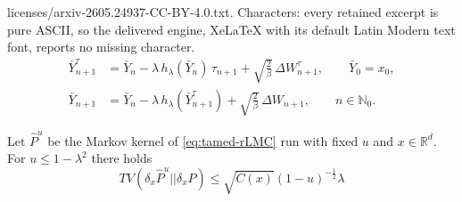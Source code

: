 \documentclass[10pt,a4paper]{amsart}
\begin{document}
licenses/arxiv-2605.24937-CC-BY-4.0.txt. Characters: every retained excerpt is pure ASCII, so the delivered engine, XeLaTeX with its default Latin Modern text font, reports no missing character.
\begin{equation}
\label{eq:tamed-rLMC}
\tag{tRLMC}
\begin{aligned}
\bar Y_{n+1}^{\tau}
&=
\bar Y_n
-
\lambda\, h_\lambda(\bar Y_n)\,\tau_{n+1}
+
\sqrt{\tfrac{2}{\beta}}\,\Delta W_{n+1}^{\tau},
\qquad
\bar Y_0 = x_0,\\
\bar Y_{n+1}
&=
\bar Y_n
-
\lambda\, h_\lambda(\bar Y_{n+1}^{\tau})
+
\sqrt{\tfrac{2}{\beta}}\,\Delta W_{n+1},
\qquad n\in\mathbb{N}_0.
\end{aligned}
\end{equation}

\begin{lemma}\label{Kl small u}
    Let $\hat{P}^u$ be the Markov kernel of \eqref{eq:tamed-rLMC} run with fixed $u$ and $x \in \mathbb{R}^d.$
    For $u\leq 1-\lambda^2$ there holds
    \[TV( \delta_x\hat{P}^u|| \delta_x P)\leq \sqrt{C(x)} (1-u)^{-\frac{1}{2}} \lambda\]
\end{lemma}
\end{document}
